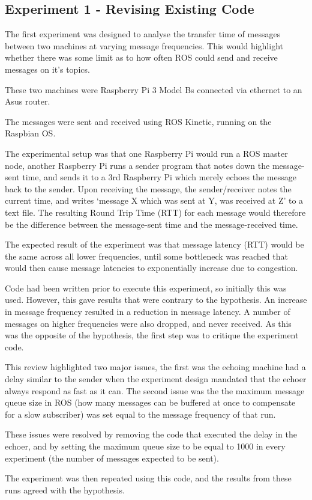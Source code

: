 \documentclass[../dissertation.tex]{subfiles}
\begin{document}
\subsection{Experiment 1 - Revising Existing Code}

The first experiment was designed to analyse the transfer time of messages between two machines at varying message frequencies. This would highlight whether there was some limit as to how often ROS could send and receive messages on it's topics.

These two machines were Raspberry Pi 3 Model Bs connected via ethernet to an Asus router.

The messages were sent and received using ROS Kinetic, running on the Raspbian OS.

The experimental setup was that one Raspberry Pi would run a ROS master node, another Raspberry Pi runs a sender program that notes down the message-sent time, and sends it to a 3rd Raspberry Pi which merely echoes the message back to the sender. Upon receiving the message, the sender/receiver notes the current time, and writes `message X which was sent at Y, was received at Z' to a text file. The resulting Round Trip Time (RTT) for each message would therefore be the difference between the message-sent time and the message-received time.

The expected result of the experiment was that message latency (RTT) would be the same across all lower frequencies, until some bottleneck was reached that would then cause message latencies to exponentially increase due to congestion.

Code had been written prior to execute this experiment, so initially this was used\cite{Experiment1InitialCode}. However, this gave results that were contrary to the hypothesis. An increase in message frequency resulted in a reduction in message latency. A number of messages on higher frequencies were also dropped, and never received. As this was the opposite of the hypothesis, the first step was to critique the experiment code.

This review highlighted two major issues, the first was the echoing machine had a delay similar to the sender when the experiment design mandated that the echoer always respond as fast as it can. The second issue was the the maximum message queue size in ROS (how many messages can be buffered at once to compensate for a slow subscriber) was set equal to the message frequency of that run.

These issues were resolved by removing the code that executed the delay in the echoer, and by setting the maximum queue size to be equal to 1000 in every experiment (the number of messages expected to be sent).

The experiment was then repeated using this code, and the results from these runs agreed with the hypothesis.
\end{document}
